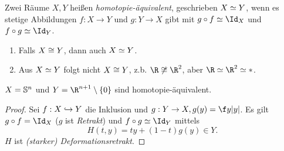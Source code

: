 \begin{df}
	Zwei Räume $X, Y$ heißen \emph{homotopie-äquivalent}, geschrieben $X \homotopic Y$, wenn es stetige Abbildungen $f: X \to Y$ und $g: Y \to X$ gibt mit $g \circ f \homotopic \Id_X$ und $f \circ g \homotopic \Id_Y$.
\end{df}

\begin{ex}
	\begin{enumerate}[1)]
		\item
			Falls $X \homeomorphic Y$, dann auch $X \homotopic Y$.
		\item
			Aus $X \homotopic Y$ folgt nicht $X \homeomorphic Y$, z.b. $\R \not \homeomorphic \R^2$, aber $\R \homotopic \R^2 \homotopic \ast$.
	\end{enumerate}
\end{ex}

\begin{ex}
	$X = \S^n$ und $Y = \R^{n+1} \setminus \{0\}$ sind homotopie-äquivalent.
	\begin{proof}
		Sei $f: X \injto Y$ die Inklusion und $g: Y \to X, g(y) = \f y{|y|}$.
		Es gilt $g \circ f = \Id_X$ ($g$ ist \emph{Retrakt}) und $f \circ g \homotopic \Id_Y$ mittels
		\[
			H(t,y) = ty + (1-t) g(y) \in Y.
		\]
		$H$ ist \emph{(starker) Deformationsretrakt}.
	\end{proof}
\end{ex}



